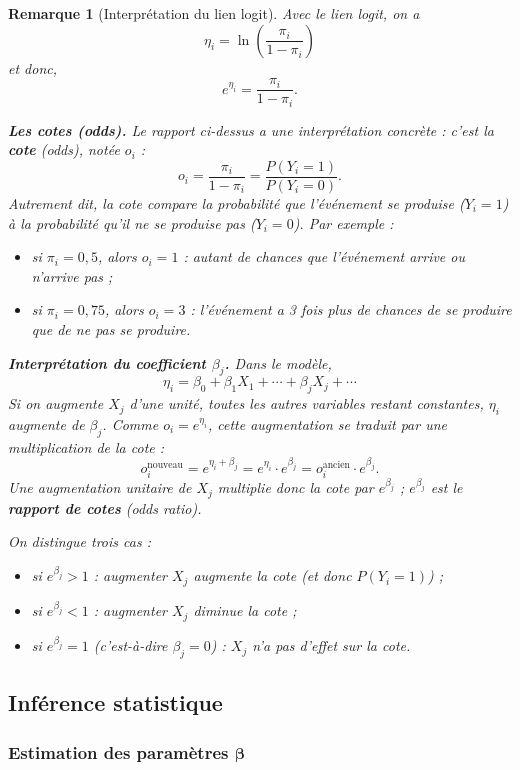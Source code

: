 \documentclass[11pt,letterpaper]{article}
\newtheorem{remarque}{Remarque}[section]
\begin{document}
\begin{remarque}[Interprétation du lien logit]\label{cotes}
Avec le lien logit, on a
\[
\eta_i = \ln\left(\frac{\pi_i}{1-\pi_i}\right)
\]
et donc,
\[
e^{\eta_i} = \frac{\pi_i}{1-\pi_i}.
\]

\textbf{Les cotes (odds).} Le rapport ci-dessus a une interprétation concrète : c'est la \textbf{cote} (\emph{odds}), notée $o_i$ :
\[
o_i = \frac{\pi_i}{1-\pi_i} = \frac{P(Y_i=1)}{P(Y_i=0)}.
\]
Autrement dit, la cote compare la probabilité que l'événement se produise ($Y_i=1$) à la probabilité qu'il ne se produise pas ($Y_i=0$). Par exemple :
\begin{itemize}
    \item si $\pi_i = 0{,}5$, alors $o_i = 1$ : autant de chances que l'événement arrive ou n'arrive pas ;
    \item si $\pi_i = 0{,}75$, alors $o_i = 3$ : l'événement a 3 fois plus de chances de se produire que de ne pas se produire.
\end{itemize}

\textbf{Interprétation du coefficient $\beta_j$.} Dans le modèle,
\[
\eta_i = \beta_0 + \beta_1 X_1 + \cdots + \beta_j X_j + \cdots
\]
Si on augmente $X_j$ d'une unité, toutes les autres variables restant constantes, $\eta_i$ augmente de $\beta_j$. Comme $o_i = e^{\eta_i}$, cette augmentation se traduit par une \emph{multiplication} de la cote :
\[
o_i^{\text{nouveau}} = e^{\eta_i + \beta_j} = e^{\eta_i} \cdot e^{\beta_j} = o_i^{\text{ancien}} \cdot e^{\beta_j}.
\]
Une augmentation unitaire de $X_j$ multiplie donc la cote par $e^{\beta_j}$ ; $e^{\beta_j}$ est le \textbf{rapport de cotes} (\emph{odds ratio}).

On distingue trois cas :
\begin{itemize}
    \item si $e^{\beta_j} > 1$ : augmenter $X_j$ augmente la cote (et donc $P(Y_i=1)$) ;
    \item si $e^{\beta_j} < 1$ : augmenter $X_j$ diminue la cote ;
    \item si $e^{\beta_j} = 1$ (c'est-à-dire $\beta_j = 0$) : $X_j$ n'a pas d'effet sur la cote.
\end{itemize}
\end{remarque}

\subsection{Inférence statistique}

\subsubsection{Estimation des paramètres $\boldsymbol{\beta}$}
\end{document}
